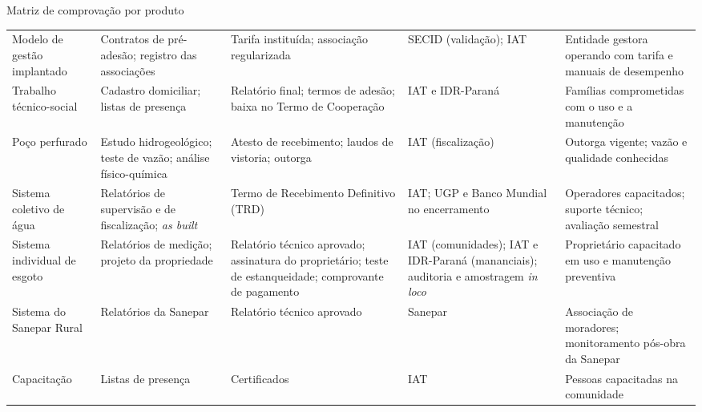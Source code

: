 \begin{landscape}
\begin{quadro}[p]
\caption{Matriz de comprovação por produto}
\label{qua:comprovacao}
\scriptsize
\renewcommand{\arraystretch}{1.3}
\begin{tabularx}{\linewidth}{|P{3.2cm}|L|L|P{3.6cm}|L|}
\hline
{} &  &  &
 &  \\ \hline
Modelo de gestão implantado & Contratos de pré-adesão; registro das associações &
  Tarifa instituída; associação regularizada & SECID (validação); IAT &
  Entidade gestora operando com tarifa e manuais de desempenho \\ \hline
Trabalho técnico-social & Cadastro domiciliar; listas de presença &
  Relatório final; termos de adesão; baixa no Termo de Cooperação & IAT e IDR-Paraná &
  Famílias comprometidas com o uso e a manutenção \\ \hline
Poço perfurado & Estudo hidrogeológico; teste de vazão; análise físico-química &
  Atesto de recebimento; laudos de vistoria; outorga & IAT (fiscalização) &
  Outorga vigente; vazão e qualidade conhecidas \\ \hline
Sistema coletivo de água & Relatórios de supervisão e de fiscalização; \textit{as built} &
  Termo de Recebimento Definitivo (TRD) & IAT; UGP e Banco Mundial no encerramento &
  Operadores capacitados; suporte técnico; avaliação semestral \\ \hline
Sistema individual de esgoto & Relatórios de medição; projeto da propriedade &
  Relatório técnico aprovado; assinatura do proprietário; teste de estanqueidade;
  comprovante de pagamento & IAT (comunidades); IAT e IDR-Paraná (mananciais);
  auditoria e amostragem \textit{in loco} & Proprietário capacitado em uso e
  manutenção preventiva \\ \hline
Sistema do Sanepar Rural & Relatórios da Sanepar & Relatório técnico aprovado &
  Sanepar & Associação de moradores; monitoramento pós-obra da Sanepar \\ \hline
Capacitação & Listas de presença & Certificados & IAT &
  Pessoas capacitadas na comunidade \\ \hline
\end{tabularx}
\end{quadro}
\end{landscape}

